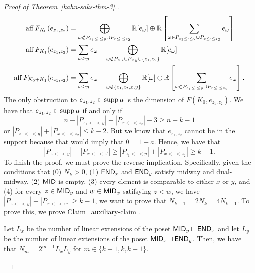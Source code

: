 \documentclass{puthesis-UG}
\begin{document}
\begin{proof}[Proof of Theorem~\ref{kahn-saks-thm-3}.]
	\begin{align*}
		\operatorname{aff} F_{K_0}(e_{z_1, z_2}) & = \bigoplus_{\omega \notin P_{z_1 \leq \cdot \leq y} \cup P_{x \leq \cdot \leq z_2}} \mathbb{R}[e_\omega] \oplus \mathbb{R} \left [ \sum_{\omega \in P_{z_1 \leq \cdot \leq y} \cup P_{x \leq \cdot \leq z_2}} e_\omega \right ] \\
		\operatorname{aff} F_{K_1} (e_{z_1, z_2}) & = \sum_{\omega \geq y} e_\omega + \bigoplus_{\omega \notin P_{\leq x} \cup P_{\geq y} \cup \{z_1, z_2\}} \mathbb{R}[e_\omega]\\
		\operatorname{aff} F_{K_0 + K_1}(e_{z_1, z_2}) & = \sum_{\omega \geq y} e_\omega + \bigoplus_{\omega \notin \{z_1, z_2, x, y\}} \mathbb{R}[\omega] \oplus \mathbb{R} \left [ \sum_{\omega \in P_{z_1 \leq \cdot \leq y} \cup P_{x \leq \cdot \leq z_2}} e_\omega \right ].
	\end{align*} 
	The only obstruction to $e_{z_1, z_2} \in \operatorname{supp} \mu$ is the dimension of $F(K_0, e_{z_1, z_2})$. We have that $e_{z_1, z_2} \in \operatorname{supp} \mu$ if and only if 
	\[
		n - |P_{z_1 < \cdot < y}| - |P_{x < \cdot < z_2}| - 3 \geq n - k - 1
	\]
	or $|P_{z_1 < \cdot < y}| + |P_{x < \cdot < z_2}| \leq k-2$. But we know that $e_{z_1, z_2}$ cannot be in the support because that would imply that $0 = 1 - a$. Hence, we have that 
	\[
		|P_{z < \cdot < y}| + |P_{x < \cdot < z'}| \geq |P_{z_1 < \cdot < y}| + |P_{x < \cdot < z_2}| \geq k-1.
	\]
	To finish the proof, we must prove the reverse implication. Specifically, given the conditions that (0) $N_k > 0$, (1) $\mathsf{END}_x$ and $\mathsf{END}_y$ satisfy midway and dual-midway, (2) $\mathsf{MID}$ is empty, (3) every element is comparable to either $x$ or $y$, and (4) for every $z \in \mathsf{MID}_y$ and $w \in \mathsf{MID}_x$ satifsying $z < w$, we have $|P_{z < \cdot < y}| + |P_{x < \cdot < w}| \geq k-1$, we want to prove that $N_{k+1} = 2N_k = 4N_{k-1}$. To prove this, we prove Claim~\ref{auxiliary-claim}.
	\begin{claim} \label{auxiliary-claim}
		Let $L_x$ be the number of linear extensions of the poset $\mathsf{MID}_y \sqcup \mathsf{END}_x$ and let $L_y$ be the number of linear extensions of the poset $\mathsf{MID}_x \sqcup \mathsf{END}_y$. Then, we have that $N_m = 2^{m-1} L_x L_y$ for $m \in \{k-1, k, k+1\}$.
	\end{claim}


\end{proof}
\end{document}
